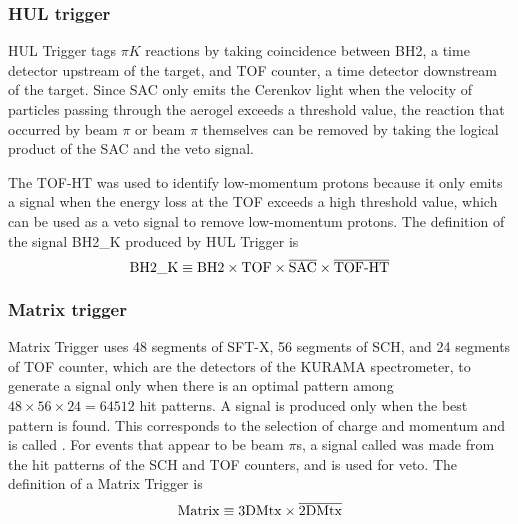 
%
\subsubsection{HUL trigger}
HUL Trigger tags $\pi K$ reactions by taking coincidence between BH2, a time detector upstream of the target, and TOF counter, a time detector downstream of the target. Since SAC only emits the Cerenkov light when the velocity of particles passing through the aerogel exceeds a threshold value, the reaction that occurred by beam $\pi$ or beam $\pi$ themselves can be removed by taking the logical product of the SAC and the veto signal.

The TOF-HT was used to identify low-momentum protons because it only emits a signal when the energy loss at the TOF exceeds a high threshold value, which can be used as a veto signal to remove low-momentum protons. The definition of the signal BH2\_K produced by HUL Trigger is
\begin{equation}
  {\rm BH2\_K \equiv BH2\times TOF\times\overline{SAC}\times\overline{TOF\mathchar`-HT} }
\end{equation}

%
\subsubsection{Matrix trigger}
Matrix Trigger uses 48 segments of SFT-X, 56 segments of SCH, and 24 segments of TOF counter, which are the detectors of the KURAMA spectrometer, to generate a signal only when there is an optimal pattern among $48\times56\times24=64512$ hit patterns. A signal is produced only when the best pattern is found. This corresponds to the selection of charge and momentum and is called . For events that appear to be beam $\pi$s, a signal called  was made from the hit patterns of the SCH and TOF counters, and is used for veto. The definition of a Matrix Trigger is
\begin{equation}
  {\rm Matrix \equiv 3D Mtx\times \overline{2D Mtx} }
\end{equation}

